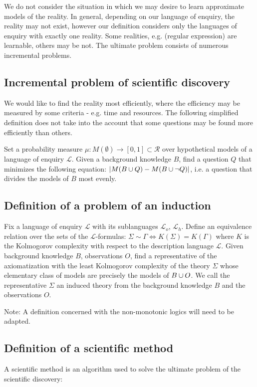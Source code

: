 We do not consider the situation in which we may desire to learn approximate models of the reality. In general, depending on our language of enquiry, the reality may not exist, however our definition considers only the languages of enquiry with exactly one reality. Some realities, e.g. (regular expression) are learnable, others may be not. The ultimate problem consists of numerous incremental problems.

\subsection{Incremental problem of scientific discovery}
We would like to find the reality most efficiently, where the efficiency may be measured by some criteria - e.g. time and resources. The following simplified definition does not take into the account that some questions may be found more efficiently than others.

Set a probability measure $\mu:M(\emptyset) \to [0,1] \subset \mathcal{R}$ over hypothetical models of a language of enquiry $\mathcal{L}$. Given a background knowledge $B$, find a question $Q$ that minimizes the following equation: $|M(B \cup {Q})-M(B \cup {\neg Q})|$, i.e. a question that divides the models of $B$ most evenly.

\subsection{Definition of a problem of an induction}
Fix a language of enquiry $\mathcal{L}$ with its sublanguages $\mathcal{L}_o$, $\mathcal{L}_h$. Define an equivalence relation over the sets of the
 $\mathcal{L}$-formulas: $\Sigma \sim \Gamma \iff K(\Sigma)=K(\Gamma)$
where $K$ is the Kolmogorov complexity with respect to the description language $\mathcal{L}$. Given background knowledge $B$, observations $O$, find a representative of the axiomatization with the least Kolmogorov complexity of the theory $\Sigma$ whose elementary class of models are precisely the models of $B \cup O$. We call the representative $\Sigma$ an induced theory from the background knowledge $B$ and the observations $O$.

Note: A definition concerned with the non-monotonic logics will need to be adapted.

\subsection{Definition of a scientific method}
A scientific method is an algorithm used to solve the ultimate problem of the scientific discovery:

